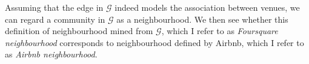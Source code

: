 Assuming that the edge in $\mathcal{G}$ indeed models the association between venues, we can regard a community in $\mathcal{G}$ as a neighbourhood. We then see whether this definition of neighbourhood mined from $\mathcal{G}$, which I refer to as \emph{Foursquare neighbourhood} corresponds to neighbourhood defined by Airbnb, which I refer to as \emph{Airbnb neighbourhood}. 
